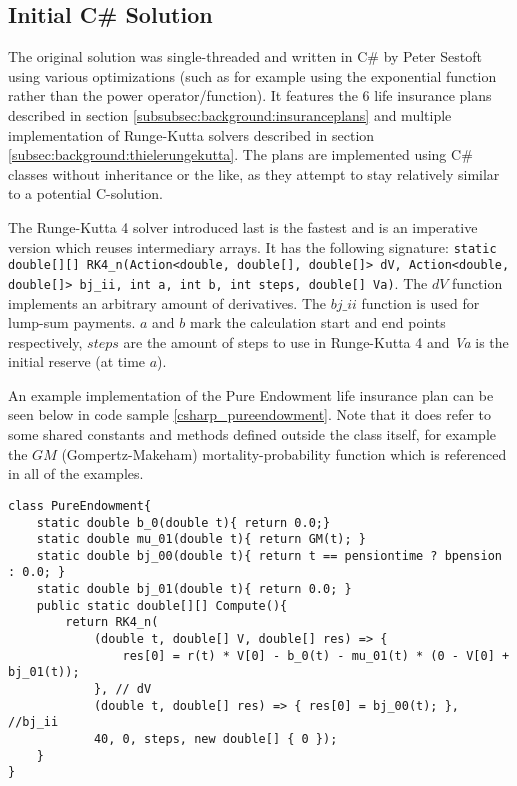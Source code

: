\subsection{Initial C\# Solution}\label{subsec:initialsolution}
The original solution was single-threaded and written in C\# by Peter Sestoft using various optimizations (such as for example using the exponential function rather than the power operator/function).
It features the 6 life insurance plans described in section \ref{subsubsec:background:insuranceplans} and multiple implementation of Runge-Kutta solvers described in section \ref{subsec:background:thielerungekutta}.
The plans are implemented using C\# classes without inheritance or the like, as they attempt to stay relatively similar to a potential C-solution.

The Runge-Kutta 4 solver introduced last is the fastest and is an imperative version which reuses intermediary arrays.
It has the following signature: \lstinline$static double[][] RK4_n(Action<double, double[], double[]> dV, Action<double, double[]> bj_ii, int a, int b, int steps, double[] Va)$.
The $dV$ function implements an arbitrary amount of derivatives.
The $bj\_ii$ function is used for lump-sum payments.
$a$ and $b$ mark the calculation start and end points respectively, $steps$ are the amount of steps to use in Runge-Kutta 4 and \textit{Va} is the initial reserve (at time $a$).

An example implementation of the Pure Endowment life insurance plan can be seen below in code sample \ref{csharp_pureendowment}. 
Note that it does refer to some shared constants and methods defined outside the class itself, for example the $GM$ (Gompertz-Makeham) mortality-probability function which is referenced in all of the examples.
\begin{lstlisting}[language=CSharp, caption=The pure endowment insurance plan expressed in C\#, label=csharp_pureendowment]
class PureEndowment{
    static double b_0(double t){ return 0.0;}
    static double mu_01(double t){ return GM(t); }
    static double bj_00(double t){ return t == pensiontime ? bpension : 0.0; }
    static double bj_01(double t){ return 0.0; }
    public static double[][] Compute(){
        return RK4_n(
            (double t, double[] V, double[] res) => { 
                res[0] = r(t) * V[0] - b_0(t) - mu_01(t) * (0 - V[0] + bj_01(t)); 
            }, // dV
            (double t, double[] res) => { res[0] = bj_00(t); }, //bj_ii
            40, 0, steps, new double[] { 0 });
    }
}
\end{lstlisting}


